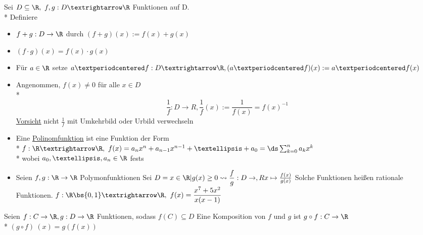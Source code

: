 %
Sei $D \subseteq \R , \ f,g: D→\R$ Funktionen auf D.\\*
Definiere
\begin{itemize}
\item{$f+g: D \to \R$ durch $(f + g)(x) := f(x) + g(x)$}
\item{$(f \cdot  g) (x) = f(x) \cdot g(x)$}
\item{Für $a\in\R$ setze $a·f: D→\R, (a·f)(x):=a·f(x)$}
\item{Angenommen, $f(x) \neq 0$ für alle $x \in D$ \\*
$$\frac{1}{f}: D \to R, \frac{1}{f}(x) := \frac{1}{f(x)} = f(x)^{-1}$$
\ul{Vorsicht} nicht $\frac{1}{f}$ mit Umkehrbild oder Urbild verwechseln}
\end{itemize}
%
\begin{itemize}
\item{Eine \ul{Polinomfunktion} ist eine Funktion der Form\\*
$f: \R → \R,\ f(x) = a_n x^n+a_{n-1}x^{n-1}+…+a_0=\ds\sum_{k=0}^n a_k x^k $\\*
wobei $a_0,…,a_n \in \R$ fest}s
%
\item{Seien $f, g : \R \to \R $ Polymonfunktionen
Sei $D = {x \in \R | g(x) \geq 0}\leadsto \dfrac{f}{g} : D \to , Rx \mapsto \frac{f(x)}{g(x)}$
Solche Funktionen heißen rationale Funktionen.
\bsp
$f:\R\bs\{0,1\}→\R, \ f(x)=\dfrac{x^7+5x^2}{x(x-1)}$}
\end{itemize}
Seien $f: C \to \R, g: D \to \R$ Funktionen, sodass $f(C) \subseteq D$
Eine Komposition von $ f $ und $ g $ ist 
%
$g \circ f : C \to \R$\\*
$(g \circ f) \ (x) = g(f(x))$